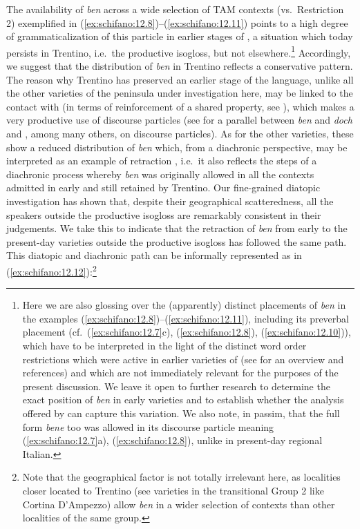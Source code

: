 \documentclass[output=paper]{langsci/langscibook}
\begin{document}
The availability of \emph{ben} across a wide selection of \gls{TAM} contexts
(vs.\ Restriction 2) exemplified in (\ref{ex:schifano:12.8})--(\ref{ex:schifano:12.11}) points to a high degree of
grammaticalization of this particle in earlier stages of , a
situation which today persists in Trentino, i.e.\ the productive isogloss, but
not elsewhere.\footnote{Here we are also glossing over the (apparently)
    distinct placements of \emph{ben} in the examples (\ref{ex:schifano:12.8})--(\ref{ex:schifano:12.11}), including its
    preverbal placement (cf.\ (\ref{ex:schifano:12.7}c), (\ref{ex:schifano:12.8}), (\ref{ex:schifano:12.10})), which have to be interpreted in
    the light of the distinct word order restrictions which were active in
    earlier varieties of  (see \citealt{Ledgeway2012} for an
    overview and references) and which are not immediately relevant for the
    purposes of the present discussion. We leave it open to further research to
    determine the exact position of \emph{ben} in early  varieties
    and to establish whether the analysis offered by
    \textcite{CognSchi2018b,CognSchi2018} can capture this variation. We also
    note, in passim, that the full form \emph{bene} too was allowed in its
    discourse particle meaning (\ref{ex:schifano:12.7}a), (\ref{ex:schifano:12.8}), unlike in present-day regional
Italian.} Accordingly, we suggest that the distribution of \emph{ben} in
Trentino reflects a conservative pattern. The reason why Trentino has preserved
an earlier stage of the language, unlike all the other varieties of the 
peninsula under investigation here, may be linked to the contact with 
(in terms of reinforcement of a shared property, see \citealt{Beninca1994,%
Cordin2011,Cognola2014}), which makes a very productive use of discourse
particles (see \citealt{CognSchi2018} for a parallel between  \emph{ben}
and  \emph{doch} and \citealt{Weydt1969}, among many others, on 
discourse particles). As for the other varieties, these show a reduced
distribution of \emph{ben} which, from a diachronic perspective, may be
interpreted as an example of retraction \citep{Norde2011}, i.e.\ it also
reflects the steps of a diachronic process whereby \emph{ben} was originally
allowed in all the contexts admitted in early  and still retained
by Trentino. Our fine-grained diatopic investigation has shown that, despite
their geographical scatteredness, all the speakers outside the productive
isogloss are remarkably consistent in their judgements. We take this to
indicate that the retraction of \emph{ben} from early  to the
present-day varieties outside the productive isogloss has followed the same
path. This diatopic and diachronic path can be informally represented as in
(\ref{ex:schifano:12.12}):\footnote{Note that the geographical factor is not totally irrelevant
    here, as localities closer located to Trentino (see varieties in the
transitional Group 2 like Cortina D’Ampezzo) allow \emph{ben} in a wider
selection of contexts than other localities of the same group.}
\end{document}
